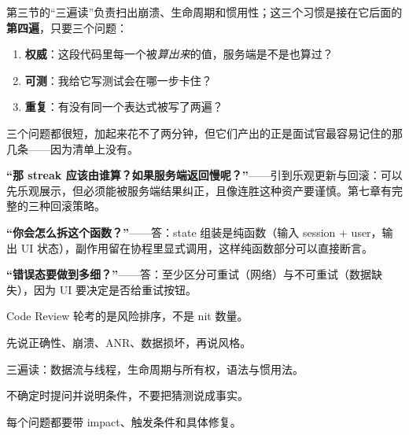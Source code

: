 第三节的“三遍读”负责扫出崩溃、生命周期和惯用性；这三个习惯是接在它后面的\textbf{第四遍}，只要三个问题：

\begin{enumerate}
  \item \textbf{权威}：这段代码里每一个被\emph{算出来}的值，服务端是不是也算过？
  \item \textbf{可测}：我给它写测试会在哪一步卡住？
  \item \textbf{重复}：有没有同一个表达式被写了两遍？
\end{enumerate}

三个问题都很短，加起来花不了两分钟，但它们产出的正是面试官最容易记住的那几条——因为清单上没有。

\begin{followup}[面试官很可能顺着追问]
\textbf{“那 streak 应该由谁算？如果服务端返回慢呢？”}——引到乐观更新与回滚：可以先乐观展示，但必须能被服务端结果纠正，且像连胜这种资产要谨慎。第七章有完整的三种回滚策略。\par
\textbf{“你会怎么拆这个函数？”}——答：state 组装是纯函数（输入 session + user，输出 UI 状态），副作用留在协程里显式调用，这样纯函数部分可以直接断言。\par
\textbf{“错误态要做到多细？”}——答：至少区分可重试（网络）与不可重试（数据缺失），因为 UI 要决定是否给重试按钮。
\end{followup}

\begin{keypoint}[五行速记]
Code Review 轮考的是风险排序，不是 nit 数量。\par
先说正确性、崩溃、ANR、数据损坏，再说风格。\par
三遍读：数据流与线程，生命周期与所有权，语法与惯用法。\par
不确定时提问并说明条件，不要把猜测说成事实。\par
每个问题都要带 impact、触发条件和具体修复。
\end{keypoint}
